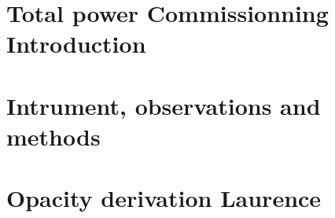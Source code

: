 \documentclass[a4paper, 11pt]{report}
\begin{document}
\newpage
%
%



\chapter{Total power Commissionning Introduction}
\label{se:intro}


\clearpage
\chapter{Intrument, observations and methods}









\clearpage
\chapter{Opacity derivation {\color{blue} Laurence}}
\label{se:opacities}

\end{document}
